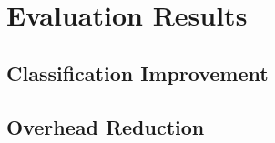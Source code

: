 \documentclass[../../main.tex]{subfiles}
\begin{document}
\section{Evaluation Results}

\subsection{Classification Improvement}

\subsection{Overhead Reduction}

\end{document}
